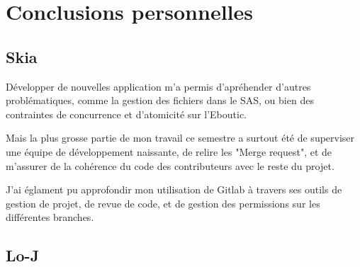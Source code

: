 \documentclass[a4paper]{report}
\begin{document}
\chapter{Conclusions personnelles}
\section{Skia}
\label{sec:skia}
\par Développer de nouvelles application m'a permis d'apréhender d'autres problématiques, comme la gestion des fichiers
dans le SAS, ou bien des contraintes de concurrence et d'atomicité sur l'Eboutic.

\par Mais la plus grosse partie de mon travail ce semestre a surtout été de superviser une équipe de développement
naissante, de relire les "Merge request", et de m'assurer de la cohérence du code des contributeurs avec le reste du
projet.

\par J'ai églament pu approfondir mon utilisation de Gitlab à travers ses outils de gestion de projet, de revue de code,
et de gestion des permissions sur les différentes branches.

\section{Lo-J}
\label{sec:lo_j}
\end{document}
